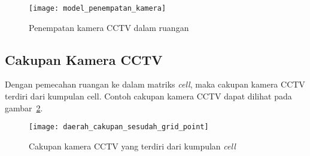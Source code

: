 
\begin{figure}[h]
	\centering  
	\texttt{[image: model\_penempatan\_kamera]}
	\caption[Penempatan kamera CCTV dalam ruangan]{Penempatan kamera CCTV dalam ruangan} 
	\label{fig:model_penempatan_kamera}
\end{figure}

\subsection{Cakupan Kamera CCTV}
Dengan pemecahan ruangan ke dalam matriks \textit{cell}, maka cakupan kamera CCTV terdiri dari kumpulan cell. Contoh cakupan kamera CCTV dapat dilihat pada gambar~\ref{fig:cakupan_kamera_cctv}.

\begin{figure}[h]
	\centering  
	\texttt{[image: daerah\_cakupan\_sesudah\_grid\_point]}
	\caption[Cakupan kamera CCTV yang terdiri dari kumpulan \textit{cell}]{Cakupan kamera CCTV yang terdiri dari kumpulan \textit{cell}}
	\label{fig:cakupan_kamera_cctv}
\end{figure}

